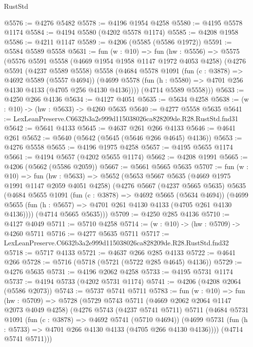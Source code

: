 \begin{lexlean}{RustStd}
\begin{coremodule}
@5576 := @4276 @5482
@5578 := @4196 @1954 @4258
@5580 := @4195 @5578 @1174
@5584 := @4194 @5580 (@4202 @5578 @1174)
@5585 := @4208 @1958
@5586 := @4211 @1147
@5589 := @4206 (@5585 (@5586 @1972))
@5591 := @5584 @5589 @5558
@5631 := fun (w : @10) =>
  fun (hw : @5556) =>
  @5575
    (@5576
      @5591
      @5558
      (@4669 @1954 @1958 @1147 @1972 @4053 @4258)
      (@4276
        @5591
        (@4237 @5589 @5558)
        @5558
        (@4684
          @5578
          @1091
          (fun (c : @3878) => @4692 @5589 (@5557 @4694))
          (@4699 @5578 (fun (h : @5580) => @4701 @256 @4130 @4133 (@4705 @256 @4130 @4136))))
        (@4714 @5589 @5558)))
@5633 := @4250 @266 @4136
@5634 := @4127 @4051
@5635 := @5634 @4258
@5638 := (w : @10) -> (hw : @5633) -> @4260 @5635
@5640 := @4277 @5558 @5635
@5641 := LexLeanPreserve.C6632b3a2e999d115038026ca828209de.R28.RustStd.fnd31
@5642 := @5641 @4133
@5645 := @4637 @261 @266 @4133
@5646 := @4641 @261
@5652 := @5640 (@5642 (@5645 (@5646 @266 @4645) @4136))
@5653 := @4276 @5558
@5655 := @4196 @1975 @4258
@5657 := @4195 @5655 @1174
@5661 := @4194 @5657 (@4202 @5655 @1174)
@5662 := @4208 @1991
@5665 := @4206 (@5662 (@5586 @2059))
@5667 := @5661 @5665 @5635
@5707 := fun (w : @10) =>
  fun (hw : @5633) =>
  @5652
    (@5653
      @5667
      @5635
      (@4669 @1975 @1991 @1147 @2059 @4051 @4258)
      (@4276
        @5667
        (@4237 @5665 @5635)
        @5635
        (@4684
          @5655
          @1091
          (fun (c : @3878) => @4692 @5665 (@5634 @4694))
          (@4699 @5655 (fun (h : @5657) => @4701 @261 @4130 @4133 (@4705 @261 @4130 @4136))))
        (@4714 @5665 @5635)))
@5709 := @4250 @285 @4136
@5710 := @4127 @4049
@5711 := @5710 @4258
@5714 := (w : @10) -> (hw : @5709) -> @4260 @5711
@5716 := @4277 @5635 @5711
@5717 := LexLeanPreserve.C6632b3a2e999d115038026ca828209de.R28.RustStd.fnd32
@5718 := @5717 @4133
@5721 := @4637 @266 @285 @4133
@5722 := @4641 @266
@5728 := @5716 (@5718 (@5721 (@5722 @285 @4645) @4136))
@5729 := @4276 @5635
@5731 := @4196 @2062 @4258
@5733 := @4195 @5731 @1174
@5737 := @4194 @5733 (@4202 @5731 @1174)
@5741 := @4206 (@4208 @2064 (@5586 @2073))
@5743 := @5737 @5741 @5711
@5783 := fun (w : @10) =>
  fun (hw : @5709) =>
  @5728
    (@5729
      @5743
      @5711
      (@4669 @2062 @2064 @1147 @2073 @4049 @4258)
      (@4276
        @5743
        (@4237 @5741 @5711)
        @5711
        (@4684
          @5731
          @1091
          (fun (c : @3878) => @4692 @5741 (@5710 @4694))
          (@4699 @5731 (fun (h : @5733) => @4701 @266 @4130 @4133 (@4705 @266 @4130 @4136))))
        (@4714 @5741 @5711)))

\end{coremodule}
\end{lexlean}
